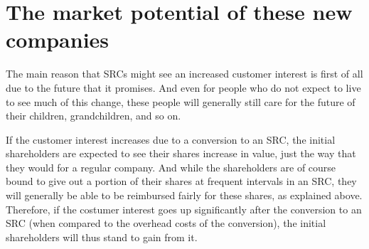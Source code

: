 \documentclass{article}
\begin{document}
%





\section{The market potential of these new companies}


The main reason that SRCs might see an increased customer interest is first of all due to the future that it promises. And even for people who do not expect to live to see much of this change, these people will generally still care for the future of their children, grandchildren, and so on. 

If the customer interest increases due to a conversion to an SRC, the initial shareholders are expected to see their shares increase in value, just the way that they would for a regular company. And while the shareholders are of course bound to give out a portion of their shares at frequent intervals in an SRC, they will generally be able to be reimbursed fairly for these shares, as explained above. Therefore, if the costumer interest goes up significantly after the conversion to an SRC (when compared to the overhead costs of the conversion), the initial shareholders will thus stand to gain from it.
\end{document}
